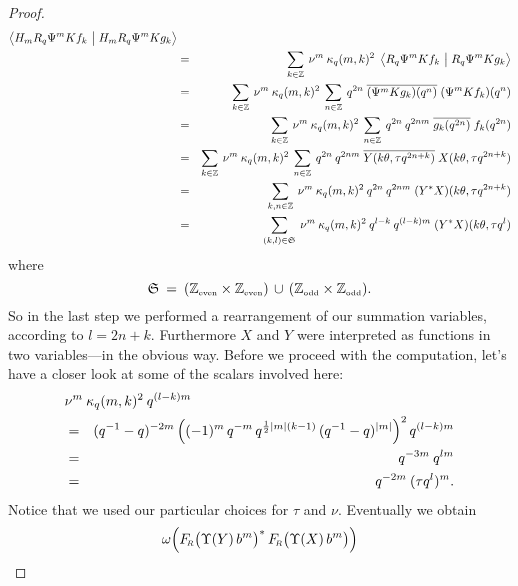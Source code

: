 \begin{proof}
\begin{eqnarray*}
      \left\langle H_m R_q \Psi^m K f_k  \,\left|\vertM\right.
                                            H_m R_q \Psi^m K g_k \right\rangle \\
&=& \sum_{k\in\ZZ} \: \nu^m \: \kq(m,k)^2 \;
      \left\langle R_q \Psi^m K f_k  \,\left|\vertM\right.
                                            R_q \Psi^m K g_k \right\rangle \\
&=& \sum_{k\in\ZZ} \: \nu^m \: \kq(m,k)^2 \:
    \sum_{n\in\ZZ} \: q^{2n} \; \overline{(\Psi^m K g_k)(q^n)}\; (\Psi^m K f_k)(q^n) \\
&=& \sum_{k\in\ZZ} \: \nu^m \: \kq(m,k)^2 \:
    \sum_{n\in\ZZ} \: q^{2n} \: q^{2nm} \; \overline{g_k(q^{2n})}\; f_k(q^{2n}) \\
&=& \sum_{k\in\ZZ} \: \nu^m \: \kq(m,k)^2 \:
    \sum_{n\in\ZZ} \: q^{2n} \: q^{2nm} \;
             \overline{Y(k\theta, \tau q^{2n+k})} \; X(k\theta, \tau q^{2n+k})    \\
&=& \sum_{k,n\in\ZZ} \:  \nu^m \: \kq(m,k)^2 \:  q^{2n} \: q^{2nm} \;
       (Y^*X)(k\theta, \tau q^{2n+k})    \\
&=& \sum_{(k,l)\in\mathfrak{S}} \:  \nu^m \: \kq(m,k)^2 \:  q^{l-k} \: q^{(l-k)m} \;
       (Y^*X)(k\theta, \tau q^l)    \\
\end{eqnarray*}
where
\begin{equation}\label{eq:spectral:summ_range}
   \mathfrak{S}  \:=\:  (\mathbb{Z}_{\rm \scriptscriptstyle even} \times \mathbb{Z}_{\rm \scriptscriptstyle even}) \,\cup\, (\mathbb{Z}_{\rm \scriptscriptstyle odd} \times \mathbb{Z}_{\rm \scriptscriptstyle odd}).
\end{equation}
So in the last step we performed a rearrangement of our summation variables,
according to $l=2n+k$.
Furthermore $X$ and $Y$ were interpreted as functions in two variables---in the obvious way.
Before we proceed with the computation, let's have a closer look at
some of the scalars involved here:
\begin{eqnarray*}
\lefteqn{\nu^m \: \kq(m,k)^2 \: q^{(l-k)m}}
\\&=&
(q^{-1}-q)^{-2m} \left(\vertL(-1)^m \, q^{-m} \, q^{\frac{1}{2}|m|(k-1)} \,
                         (q^{-1}-q)^{|m|} \right)^2  q^{(l-k)m}
\\&=&
q^{-3m} \: q^{lm}
\\&=&
q^{-2m} \: (\tau q^l)^m.
\end{eqnarray*}
Notice that we used our particular choices for $\tau$ and $\nu$. Eventually we obtain
\begin{eqnarray*}
    \omega \!\left(\vertL  \FRabb \!\left(\Upsilon(Y)\, b^m \vertM\right)^*
                           \FRabb \!\left(\Upsilon(X)\, b^m \vertM\right) \right)

\end{eqnarray*}
\end{proof}
